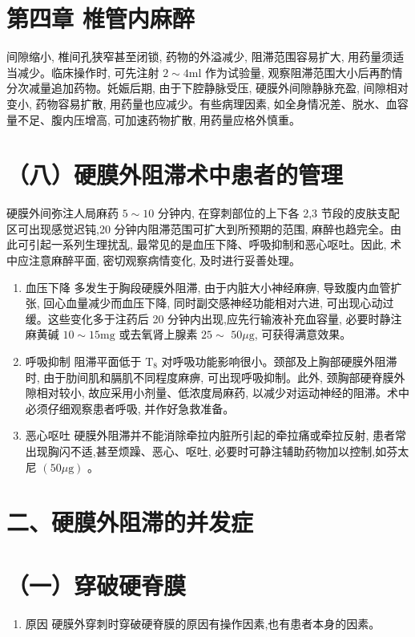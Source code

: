 \documentclass[10pt]{article}
\begin{document}
\section*{第四章 椎管内麻醉}
间隙缩小, 椎间孔狭窄甚至闭锁, 药物的外溢减少, 阻滞范围容易扩大, 用药量须适当减少。临床操作时, 可先注射 $2 \sim 4 \mathrm{ml}$ 作为试验量, 观察阻滞范围大小后再酌情分次减量追加药物。奼娠后期, 由于下腔静脉受压, 硬膜外间隙静脉充盈, 间隙相对变小, 药物容易扩散, 用药量也应减少。有些病理因素, 如全身情况差、脱水、血容量不足、腹内压增高, 可加速药物扩散, 用药量应格外慎重。

\section*{（八）硬膜外阻滞术中患者的管理}
硬膜外间弥注人局麻药 $5 \sim 10$ 分钟内, 在穿刺部位的上下各 2,3 节段的皮肤支配区可出现感觉迟钝,20 分钟内阻滞范围可扩大到所预期的范围, 麻醉也趋完全。由此可引起一系列生理扰乱, 最常见的是血压下降、呼吸抑制和恶心呕吐。因此, 术中应注意麻醉平面, 密切观察病情变化, 及时进行妥善处理。

\begin{enumerate}
  \item 血压下降 多发生于胸段硬膜外阻滞, 由于内脏大小神经麻痹, 导致腹内血管扩张, 回心血量减少而血压下降, 同时副交感神经功能相对六进, 可出现心动过缓。这些变化多于注药后 20 分钟内出现,应先行输液补充血容量, 必要时静注麻黄碱 $10 \sim 15 \mathrm{mg}$ 或去氧肾上腺素 $25 \sim$ $50 \mu \mathrm{g}$, 可获得满意效果。

  \item 呼吸抑制 阻滞平面低于 $\mathrm{T}_{8}$ 对呼吸功能影响很小。颈部及上胸部硬膜外阻滞时, 由于肋间肌和膈肌不同程度麻痹, 可出现呼吸抑制。此外, 颈胸部硬脊膜外隙相对较小, 故应采用小剂量、低浓度局麻药, 以减少对运动神经的阻滞。术中必须仔细观察患者呼吸, 并作好急救准备。

  \item 恶心呕吐 硬膜外阻滞并不能消除牵拉内脏所引起的牵拉痛或牵拉反射, 患者常出现胸闪不适,甚至烦躁、恶心、呕吐, 必要时可静注辅助药物加以控制,如芬太尼 $(50 \mu \mathrm{g})$ 。

\end{enumerate}

\section*{二、硬膜外阻滞的并发症}
\section*{（一）穿破硬脊膜}
\begin{enumerate}
  \item 原因 硬膜外穿刺时穿破硬脊膜的原因有操作因素,也有患者本身的因素。
\end{enumerate}
\end{document}
